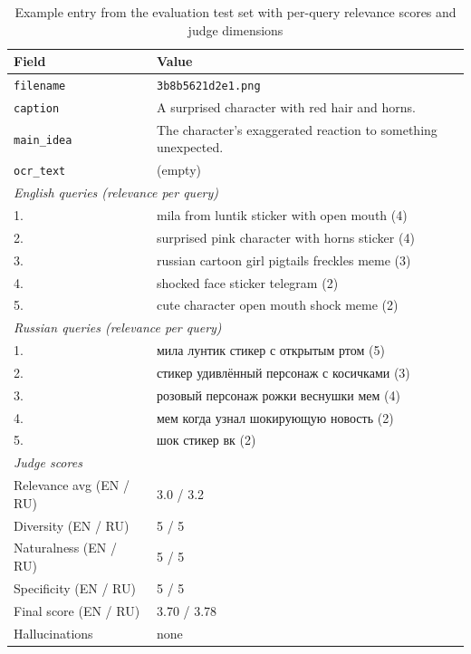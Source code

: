 \documentclass[a4paper,12pt]{article}
\begin{document}
\begin{table}[H]
\centering
\caption{Example entry from the evaluation test set with per-query relevance scores and judge dimensions}
\label{tab:eval_example}
\small
\begin{tabular}{|l|p{10cm}|}
\hline
\textbf{Field} & \textbf{Value} \\
\hline
\texttt{filename} & \texttt{3b8b5621d2e1.png} \\
\hline
\texttt{caption} & A surprised character with red hair and horns. \\
\hline
\texttt{main\_idea} & The character's exaggerated reaction to something unexpected. \\
\hline
\texttt{ocr\_text} & (empty) \\
\hline
\multicolumn{2}{|l|}{\textit{English queries (relevance per query)}} \\
\hline
1. & mila from luntik sticker with open mouth (4) \\
\hline
2. & surprised pink character with horns sticker (4) \\
\hline
3. & russian cartoon girl pigtails freckles meme (3) \\
\hline
4. & shocked face sticker telegram (2) \\
\hline
5. & cute character open mouth shock meme (2) \\
\hline
\multicolumn{2}{|l|}{\textit{Russian queries (relevance per query)}} \\
\hline
1. & мила лунтик стикер с открытым ртом (5) \\
\hline
2. & стикер удивлённый персонаж с косичками (3) \\
\hline
3. & розовый персонаж рожки веснушки мем (4) \\
\hline
4. & мем когда узнал шокирующую новость (2) \\
\hline
5. & шок стикер вк (2) \\
\hline
\multicolumn{2}{|l|}{\textit{Judge scores}} \\
\hline
Relevance avg (EN / RU) & 3.0 / 3.2 \\
\hline
Diversity (EN / RU) & 5 / 5 \\
\hline
Naturalness (EN / RU) & 5 / 5 \\
\hline
Specificity (EN / RU) & 5 / 5 \\
\hline
Final score (EN / RU) & 3.70 / 3.78 \\
\hline
Hallucinations & none \\
\hline
\end{tabular}
\end{table}
\end{document}
